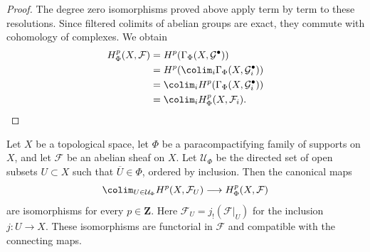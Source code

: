 \begin{proof}
The degree zero isomorphisms proved above apply term by term to these
resolutions. Since filtered colimits of abelian groups are exact, they
commute with cohomology of complexes. We obtain
$$
\begin{aligned}
H^p_\Phi(X, \mathcal{F})
&= H^p(\Gamma_\Phi(X, \mathcal{G}^\bullet)) \\
&= H^p(\colim_i \Gamma_\Phi(X, \mathcal{G}_i^\bullet)) \\
&= \colim_i H^p(\Gamma_\Phi(X, \mathcal{G}_i^\bullet)) \\
&= \colim_i H^p_\Phi(X, \mathcal{F}_i).
\end{aligned}
$$
\end{proof}

\begin{lemma}
\label{lemma-family-supports-colimit-extension-by-zero}
\begin{reference}
\cite[Chapter III, \S 3.10, Corollary 1, p. 182]{Tohoku}
\end{reference}
Let $X$ be a topological space, let $\Phi$ be a paracompactifying family
of supports on $X$, and let $\mathcal{F}$ be an abelian sheaf on $X$.
Let $\mathcal{U}_\Phi$ be the directed set of open subsets $U\subset X$
such that $\overline{U}\in\Phi$, ordered by inclusion. Then the canonical
maps
$$
\colim_{U\in\mathcal{U}_\Phi} H^p(X,\mathcal{F}_U)
\longrightarrow H^p_\Phi(X,\mathcal{F})
$$
are isomorphisms for every $p\in\mathbf{Z}$. Here
$\mathcal{F}_U=j_!(\mathcal{F}|_U)$ for the inclusion $j:U\to X$.
These isomorphisms are functorial in $\mathcal{F}$ and compatible with the
connecting maps.
\end{lemma}

